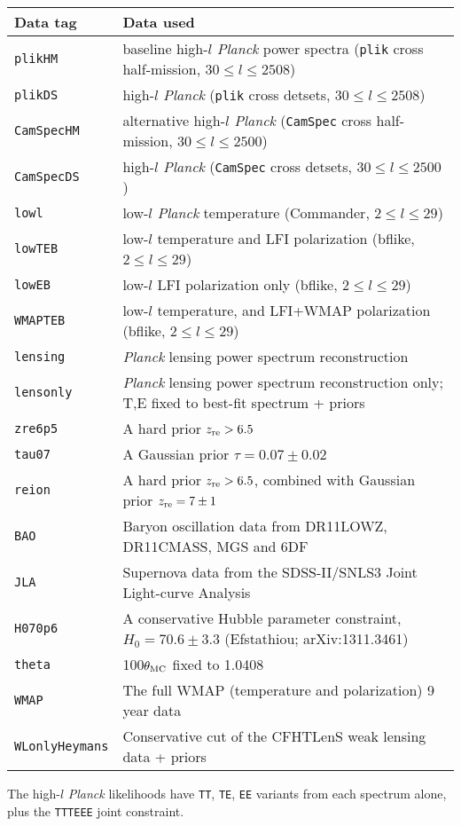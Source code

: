 \begin{tabular} { l   l  }
Data tag & Data used\\
\hline
{\tt plikHM}         & baseline high-$l$ \textit{Planck} power spectra ({\tt plik} cross half-mission, $30\le l\le 2508$) \\
{\tt plikDS}         & high-$l$ \textit{Planck} ({\tt plik} cross detsets, $30\le l\le 2508$) \\
{\tt CamSpecHM}      & alternative high-$l$ \textit{Planck}  ({\tt CamSpec} cross half-mission, $30\le l\le 2500$) \\
{\tt CamSpecDS}      & high-$l$ \textit{Planck} ({\tt CamSpec} cross detsets, $30\le l\le 2500$) \\
{\tt lowl }          & low-$l$ \textit{Planck} temperature (Commander, $2\le l \le 29$)  \\
{\tt lowTEB}         & low-$l$ temperature and LFI polarization (bflike, $2\le l \le 29$)\\
{\tt lowEB}          & low-$l$  LFI polarization only (bflike, $2\le l \le 29$)\\
{\tt WMAPTEB}        & low-$l$ temperature, and  LFI+WMAP polarization (bflike, $2\le l \le 29$)\\
{\tt lensing}        & \textit{Planck}  lensing power spectrum reconstruction\\
{\tt lensonly}       & \textit{Planck}  lensing power spectrum reconstruction only; T,E fixed to best-fit spectrum + priors\\
{\tt zre6p5}         & A hard prior $z_{\rm re} > 6.5$\\
{\tt tau07}          & A Gaussian prior $\tau = 0.07 \pm 0.02$\\
{\tt reion}          & A hard prior $z_{\rm re} > 6.5$, combined with Gaussian prior $z_{\rm re} = 7\pm 1$\\
{\tt BAO}            & Baryon oscillation data from DR11LOWZ, DR11CMASS, MGS and 6DF \\
{\tt JLA}            & Supernova data from the SDSS-II/SNLS3 Joint Light-curve Analysis \\
{\tt H070p6}         & A conservative Hubble parameter constraint, $H_0 = 70.6\pm 3.3$ (Efstathiou; arXiv:1311.3461) \\
{\tt theta}          & 100$\theta_{\rm MC}$ fixed to 1.0408 \\
{\tt WMAP}           & The full WMAP (temperature and polarization) 9 year data \\
{\tt WLonlyHeymans}      & Conservative cut of the CFHTLenS weak lensing data + priors \\
\hline
\end{tabular}
\vskip 1cm
The high-$l$ \textit{Planck} likelihoods have {\tt TT}, {\tt TE}, {\tt EE} variants from each spectrum alone, plus the {\tt TTTEEE} joint constraint.

